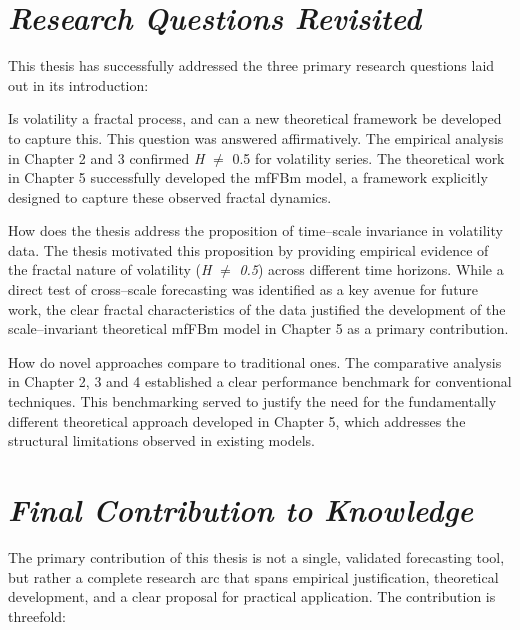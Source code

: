 \documentclass[12pt,a4paper]{report}
\numberwithin{equation}{section}
\begin{document}
\hypertarget{research--questions--revisited}{%
\section{\texorpdfstring{\emph{\textbf{Research Questions
Revisited}}}{Research Questions Revisited}}\label{research--questions--revisited}}

This thesis has successfully addressed the three primary research
questions laid out in its introduction:

Is volatility a fractal process, and can a new theoretical framework be
developed to capture this. This question was answered affirmatively. The
empirical analysis in Chapter 2 and 3 confirmed \emph{H} $\neq$ 0.5 for
volatility series. The theoretical work in Chapter 5 successfully
developed the mfFBm model, a framework explicitly designed to capture
these observed fractal dynamics.

How does the thesis address the proposition of time--scale invariance in
volatility data. The thesis motivated this proposition by providing
empirical evidence of the fractal nature of volatility (\emph{H}
\emph{$\neq$} \emph{0.5}) across different time horizons. While a direct test
of cross--scale forecasting was identified as a key avenue for future
work, the clear fractal characteristics of the data justified the
development of the scale--invariant theoretical mfFBm model in Chapter 5
as a primary contribution.

How do novel approaches compare to traditional ones. The comparative
analysis in Chapter 2, 3 and 4 established a clear performance benchmark
for conventional techniques. This benchmarking served to justify the
need for the fundamentally different theoretical approach developed in
Chapter 5, which addresses the structural limitations observed in
existing models.

\hypertarget{final--contribution--to--knowledge}{%
\section{\texorpdfstring{\emph{\textbf{Final Contribution to
Knowledge}}}{Final Contribution to Knowledge}}\label{final--contribution--to--knowledge}}

The primary contribution of this thesis is not a single, validated
forecasting tool, but rather a complete research arc that spans
empirical justification, theoretical development, and a clear proposal
for practical application. The contribution is threefold:
\end{document}
